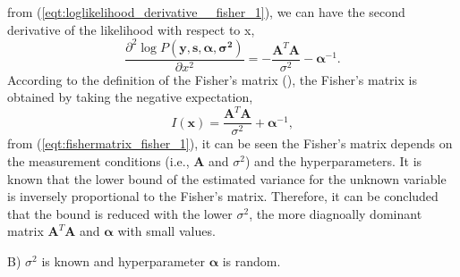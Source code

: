 \documentclass[proposal]{umthesis}          %
\begin{document}
from (\ref{eqt:loglikelihood_derivative__fisher_1}), we can have the second derivative of the likelihood with respect to x,
\begin{equation} \label{eqt:loglikelihood_second_derivative__fisher_1}
\frac{\partial^{2} \log P(\mathbf{y,s,\alpha, \sigma^{2}})}{\partial x^2} = -\frac{\mathbf{A}^{T}\mathbf{A}}{\sigma^{2}} - \boldsymbol{\alpha}^{-1}.
\end{equation}
According to the definition of the Fisher's matrix (), the Fisher's matrix is obtained by taking the negative expectation, 
\begin{equation} \label{eqt:fishermatrix_fisher_1}
I(\boldsymbol{x}) = \frac{\mathbf{A}^{T}\mathbf{A}}{\sigma^{2}} + \boldsymbol{\alpha}^{-1},
\end{equation}
from (\ref{eqt:fishermatrix_fisher_1}), it can be seen the Fisher's matrix depends on the measurement conditions (i.e., $\mathbf{A}$ and $\sigma^{2}$) and the hyperparameters.
It is known that the lower bound of the estimated variance for the unknown variable is inversely proportional to the Fisher's matrix.
Therefore, it can be concluded that the bound is reduced with the lower $\sigma^{2}$, the more diagnoally dominant matrix $\mathbf{A}^{T}\mathbf{A}$ and $\boldsymbol{\alpha}$ with small values.      

\noindent
B) $\sigma^{2}$ is known and hyperparameter $\mathbf{\alpha}$ is random.
\end{document}
